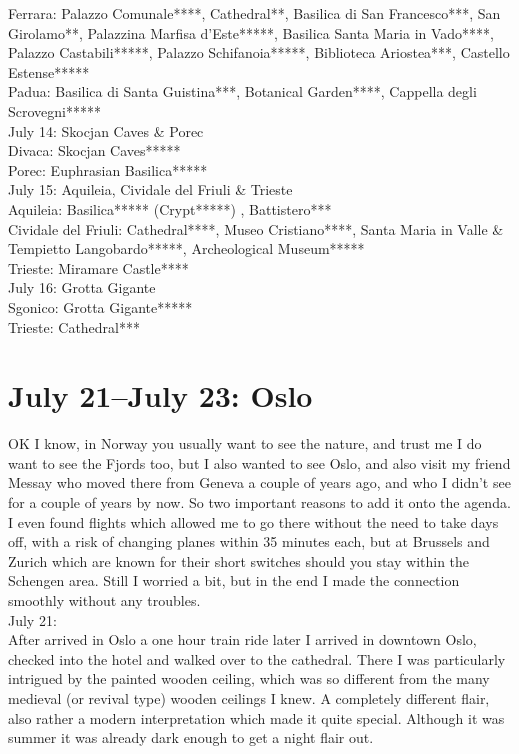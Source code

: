 Ferrara: Palazzo Comunale****, Cathedral**, Basilica di San Francesco***, San Girolamo**, Palazzina Marfisa d'Este*****, Basilica Santa Maria in Vado****, Palazzo Castabili*****, Palazzo Schifanoia*****, Biblioteca Ariostea***, Castello Estense*****\\
Padua: Basilica di Santa Guistina***, Botanical Garden****, Cappella degli Scrovegni*****\\

July 14: Skocjan Caves \& Porec\\
Divaca: Skocjan Caves*****\\
Porec: Euphrasian Basilica*****\\

July 15: Aquileia, Cividale del Friuli \& Trieste\\
Aquileia: Basilica***** (Crypt*****) , Battistero***\\
Cividale del Friuli: Cathedral****, Museo Cristiano****, Santa Maria in Valle \& Tempietto Langobardo*****, Archeological Museum*****\\
Trieste: Miramare Castle****\\

July 16: Grotta Gigante\\
Sgonico: Grotta Gigante*****\\
Trieste: Cathedral***

\section{July 21--July 23: Oslo}
\label{Oslo2017}

OK I know, in Norway you usually want to see the nature, and trust me I do want to see the Fjords too, but I also wanted to see Oslo, and also visit my friend Messay who moved there from Geneva a couple of years ago, and who I didn't see for a couple of years by now. So two important reasons to add it onto the agenda. I even found flights which allowed me to go there without the need to take days off, with a risk of changing planes within 35 minutes each, but at Brussels and Zurich which are known for their short switches should you stay within the Schengen area. Still I worried a bit, but in the end I made the connection smoothly without any troubles.\\

July 21:\\
After arrived in Oslo a one hour train ride later I arrived in downtown Oslo, checked into the hotel and walked over to the cathedral. There I was particularly intrigued by the painted wooden ceiling, which was so different from the many medieval (or revival type) wooden ceilings I knew. A completely different flair, also rather a modern interpretation which made it quite special. Although it was summer it was already dark enough to get a night flair out.\\

